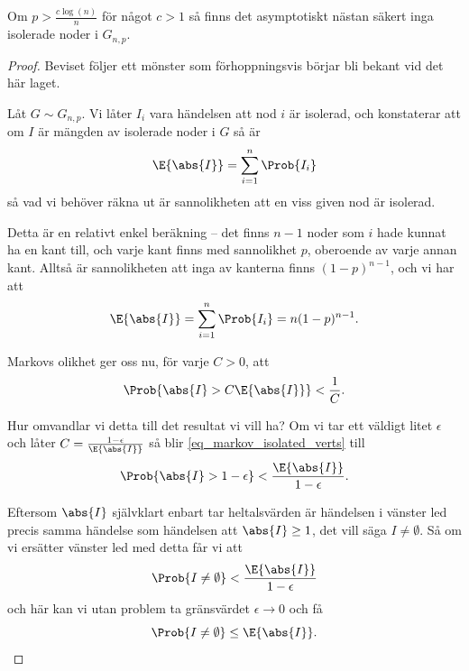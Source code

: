 \documentclass[nobib]{tufte-handout}
\begin{document}
\begin{proposition}
    Om $p > \frac{c\log(n)}{n}$ för något $c > 1$ så finns det asymptotiskt nästan säkert inga isolerade noder i $G_{n,p}$.

    \begin{proof}
        Beviset följer ett mönster som förhoppningsvis börjar bli bekant vid det här laget.

        Låt $G \sim G_{n,p}$. Vi låter $I_i$ vara händelsen att nod $i$ är isolerad, och konstaterar att om $I$ är mängden av isolerade noder i $G$ så är
        $$\E{\abs{I}} = \sum_{i=1}^{n} \Prob{I_i}$$
        så vad vi behöver räkna ut är sannolikheten att en viss given nod är isolerad.

        Detta är en relativt enkel beräkning -- det finns $n-1$ noder som $i$ hade kunnat ha en kant till, och varje kant finns med sannolikhet $p$, oberoende av varje annan kant. Alltså är sannolikheten att inga av kanterna finns $(1-p)^{n-1}$, och vi har att
        $$\E{\abs{I}} = \sum_{i=1}^{n} \Prob{I_i} = n(1-p)^{n-1}.$$
        
        Markovs olikhet ger oss nu, för varje $C > 0$, att
        \begin{equation}\label{eq_markov_isolated_verts}
            \Prob{\abs{I} > C\E{\abs{I}}} < \frac{1}{C}.
        \end{equation}

        Hur omvandlar vi detta till det resultat vi vill ha? Om vi tar ett väldigt litet $\epsilon$ och låter $C = \frac{1 - \epsilon}{\E{\abs{I}}}$ så blir \eqref{eq_markov_isolated_verts} till
        $$\Prob{\abs{I} > 1 - \epsilon} < \frac{\E{\abs{I}}}{1 - \epsilon}.$$

        Eftersom $\abs{I}$ självklart enbart tar heltalsvärden är händelsen i vänster led precis samma händelse som händelsen att $\abs{I} \geq 1$, det vill säga $I \neq \emptyset$. Så om vi ersätter vänster led med detta får vi att
        $$\Prob{I \neq \emptyset} < \frac{\E{\abs{I}}}{1-\epsilon}$$
        och här kan vi utan problem ta gränsvärdet $\epsilon \to 0$ och få
        $$\Prob{I \neq \emptyset} \leq \E{\abs{I}}.$$


\end{proof}
\end{proposition}
\end{document}
